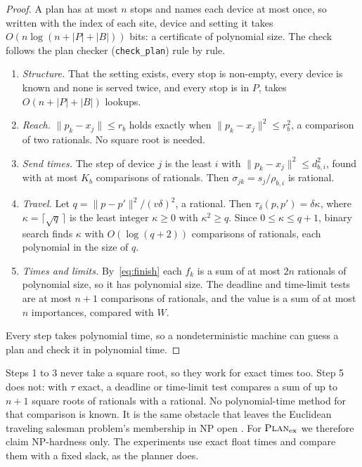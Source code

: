 \begin{proof}
A plan has at most $n$ stops and names each device at most once, so written
with the index of each site, device and setting it takes
$O(n\log(n+|P|+|B|))$ bits: a certificate of polynomial size. The check
follows the plan checker (\texttt{check\_plan}) rule by rule.
\begin{enumerate}
  \item \emph{Structure.} That the setting exists, every stop is non-empty,
    every device is known and none is served twice, and every stop is in
    $P$, takes $O(n+|P|+|B|)$ lookups.
  \item \emph{Reach.} $\lVert p_k-x_j\rVert\le r_b$ holds exactly when
    $\lVert p_k-x_j\rVert^2\le r_b^2$, a comparison of two rationals. No
    square root is needed.
  \item \emph{Send times.} The step of device $j$ is the least $i$ with
    $\lVert p_k-x_j\rVert^2\le d_{b,i}^2$, found with at most $K_b$
    comparisons of rationals. Then $\sigma_{jk}=s_j/\rho_{b,i}$ is rational.
  \item \emph{Travel.} Let $q=\lVert p-p'\rVert^2/(v\delta)^2$, a rational.
    Then $\tau_\delta(p,p')=\delta\kappa$, where $\kappa=\lceil\sqrt q\,\rceil$
    is the least integer $\kappa\ge 0$ with $\kappa^2\ge q$. Since
    $0\le\kappa\le q+1$, binary search finds $\kappa$ with $O(\log(q+2))$
    comparisons of rationals, each polynomial in the size of $q$.
  \item \emph{Times and limits.} By~\eqref{eq:finish} each $f_k$ is a sum of
    at most $2n$ rationals of polynomial size, so it has polynomial size. The
    deadline and time-limit tests are at most $n+1$ comparisons of
    rationals, and the value is a sum of at most $n$ importances, compared
    with $W$.
\end{enumerate}
Every step takes polynomial time, so a nondeterministic machine can guess a
plan and check it in polynomial time.
\end{proof}

\begin{remark}
\label{rem:exact}
Steps 1 to 3 never take a square root, so they work for exact times too.
Step 5 does not: with $\tau$ exact, a deadline or time-limit test compares a
sum of up to $n+1$ square roots of rationals with a rational. No
polynomial-time method for that comparison is known. It is the same obstacle
that leaves the Euclidean traveling salesman problem's membership in NP open
\cite{GareyGrahamJohnson1976}. For $\textsc{Plan}_{\mathrm{ex}}$ we therefore claim
NP-hardness only. The experiments use exact float times and compare them
with a fixed slack, as the planner does.
\end{remark}


